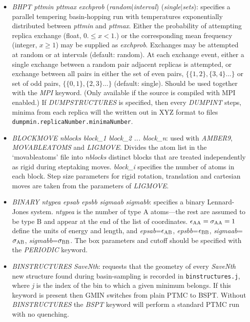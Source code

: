 \documentclass[12pt,a4paper,dvips]{article}
\begin{document}
\begin{itemize}
\item {{\it BHPT pttmin pttmax exchprob\/} ({\it random\/}$|${\it interval\/}) ({\it single\/}$|${\it sets\/})\/}:
specifies a parallel tempering basin-hopping run with temperatures exponentially distributed between {\it pttmin\/} and
{\it pttmax\/}. Either the probability of attempting replica exchange (float, $0. \le x < 1.$) or the corresponding mean frequency
(integer, $x \ge 1$) may be supplied as {\it exchprob\/}. Exchanges may be attempted at random or at intervals (default: random).
At each exchange event, either a single exchange between a random pair adjacent replicas is attempted, or exchange between all
pairs in either the set of even pairs, $\{\{1,2\},\{3,4\}...\}$ or set of odd pairs, $\{\{0,1\},\{2,3\}...\}$ (default: single).
Should be used together with the {\it MPI\/} keyword.
(Only available if the source is compiled with MPI enabled.) If {\it DUMPSTRUCTURES\/} is specified, then every {\it DUMPINT\/} steps, minima from each replica will the written out in XYZ format to files {\tt dumpmin.replicaNumber.minimaNumber}.

\item {\it BLOCKMOVE nblocks block\_1 block\_2 ... block\_n}: used with {\it AMBER9\/}, {\it MOVABLEATOMS} and {\it LIGMOVE}. 
Divides the atom list in the \lq movableatoms' file into {\it nblocks} distinct blocks that are treated independently as 
rigid during steptaking moves. {\it block\_i} specifies the number of atoms in each block. Step size parameters for rigid 
rotation, translation and cartesian moves are taken from the parameters of {\it LIGMOVE}.

\item {\it BINARY ntypea epsab epsbb sigmaab sigmabb\/}: specifies a binary Lennard-Jones
system. {\it ntypea\/} is the number of type
A atoms---the rest are assumed to be type B and appear at the end of the list
of coordinates. $\epsilon_{\rm AA}=\sigma_{\rm AA}=1$ define the units of energy and length,
and {\it epsab\/}=$\epsilon_{\rm AB}$, {\it epsbb\/}=$\epsilon_{\rm BB}$,
{\it sigmaab\/}=$\sigma_{\rm AB}$, {\it sigmabb\/}=$\sigma_{\rm BB}$.
The box parameters and cutoff should be specified with the {\it PERIODIC\/} keyword.

\item {\it BINSTRUCTURES SaveNth}: requests that the geometry of every {\it SaveNth} 
new structure found during basin-sampling is
recorded in {\tt binstructures.j}, where {\it j} is the index of the bin
to which a given minimum belongs. If this keyword is
present then GMIN switches from plain PTMC to BSPT.  
Without {\it BINSTRUCTURES} the {\it BSPT} keyword will perform a
standard PTMC run with no quenching. 


\end{itemize}
\end{document}
